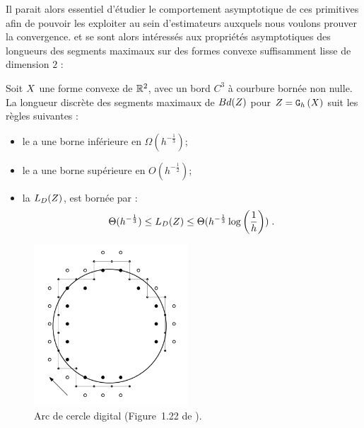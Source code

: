 Il parait alors essentiel d'étudier le comportement asymptotique de ces
primitives afin de pouvoir les exploiter au sein d'estimateurs auxquels nous
voulons prouver la convergence.  et
 se sont alors intéressés aux
propriétés asymptotiques des longueurs des segments maximaux sur des formes
convexe suffisamment lisse de dimension $2$ :
%
\begin{lemma}{}
  \label{lem:law-length-MDSS}
  Soit $X$ une forme convexe de $\mathbb{R}^2$, avec un bord $C^3$ à
  courbure bornée non nulle. La longueur discrète des segments maximaux de
  $Bd({Z})$ pour $Z = \mathtt{G}_{h}\left(X\right)$ suit les règles suivantes :
  \begin{itemize}
    \item le  a une borne inférieure en
    $\Omega(h^{-\frac{1}{3}})$;
    \item le  a une borne supérieure en
    $O(h^{-\frac{1}{2}})$;
    \item la  $L_D({Z})$, est
    bornée par :
    \begin{equation}
      \label{eq:lengthMS}
      \Theta(h^{-\frac{1}{3}}) \le L_D( {Z} ) \le \Theta(h^{-\frac{1}{3}} \log \left(\frac{1}{h}\right))\;.
    \end{equation}
  \end{itemize}
\end{lemma}


\begin{figure}[ht]{
    \begin{center}
    \includegraphics[height=6cm]{images/Notions/DCA}
    \end{center}}
    \caption[Arc de cercle digital.]{Arc de cercle digital (Figure~1.22 de \cite{Roussillon2009}).\label{fig:dca-figure}}
\end{figure}


